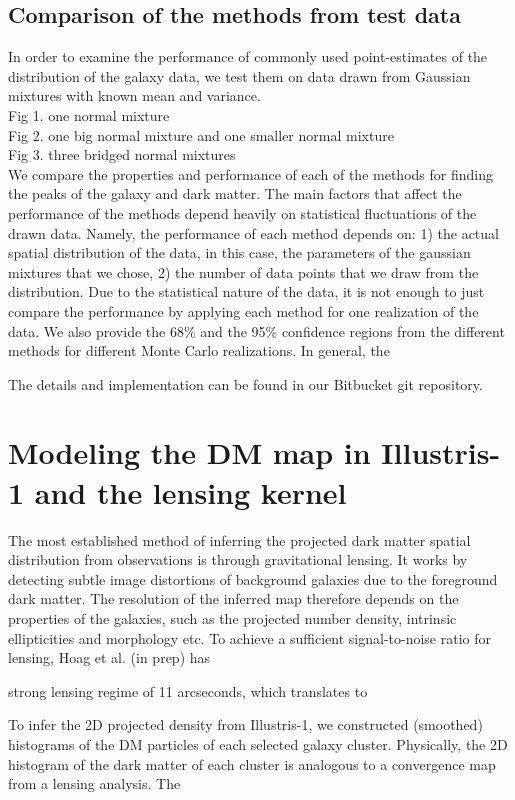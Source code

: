 \subsection{Comparison of the methods from test data}
In order to examine the performance of commonly used point-estimates of the
distribution of the galaxy data, we test them on data drawn from Gaussian mixtures with
known mean and variance. \\
Fig 1. one normal mixture \\  
Fig 2. one big normal mixture and one smaller normal mixture \\ 
Fig 3. three bridged normal mixtures \\  
We compare the properties and performance of each of the
methods for finding the peaks of the galaxy and dark matter. 
The main factors that affect the performance of the methods depend heavily on
statistical fluctuations of the drawn data. Namely, the performance of each
method depends on: 1) the
actual spatial distribution of the data, in this case, the parameters of the
gaussian mixtures that we chose, 2) the number of data points that we draw from 
the distribution.
Due to the statistical nature of the data, it is not enough to just
compare the performance by applying each method for one realization of the
data. We also provide the 68\% and the 95\% confidence regions from the
different methods for different Monte Carlo realizations.
In general, the 


The details and implementation can be found in our Bitbucket git repository.



\section{Modeling the DM map in Illustris-1 and the lensing kernel}
The most established method of inferring the projected dark matter spatial 
distribution from observations is through gravitational lensing.
It works by detecting subtle image distortions of background galaxies due to
the foreground dark matter. The resolution of the inferred map therefore 
depends on the properties of the galaxies, such as the projected number density, 
intrinsic ellipticities and morphology etc.
To achieve a sufficient signal-to-noise ratio for lensing, 
Hoag et al. (in prep) has  


strong lensing regime of 11 arcseconds, which translates to 




To infer the 2D projected density from Illustris-1, 
we constructed (smoothed) histograms of the DM
particles of each selected galaxy cluster. 
Physically, the 2D histogram of the dark matter of each cluster 
is analogous to a convergence map from a lensing analysis. 
The  



